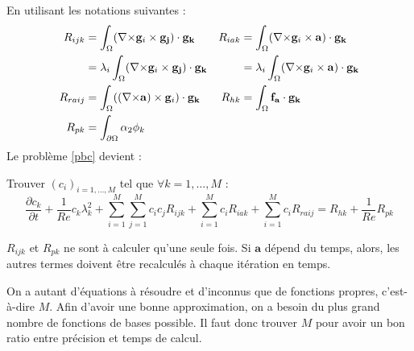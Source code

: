 En utilisant les notations suivantes :
\begin{align*}
  R_{ijk} &= \int_\Omega({\nabla\times}\mathbf{g}_i\times \mathbf{g_j})\cdot\mathbf{g_k} & R_{iak} &= \int_\Omega({\nabla\times}\mathbf{g}_i\times \mathbf{a})\cdot\mathbf{g_k}\\
  &= \lambda_i\int_\Omega({\nabla\times}\mathbf{g}_i\times \mathbf{g_j})\cdot\mathbf{g_k} & &= \lambda_i\int_\Omega({\nabla\times}\mathbf{g}_i\times \mathbf{a})\cdot\mathbf{g_k}\\
R_{raij} &= \int_\Omega(({\nabla\times}\mathbf{a})\times \mathbf{g}_i)\cdot\mathbf{g_k} & R_{hk} &= \int_\Omega\mathbf{f_a}\cdot\mathbf{g_k}\\
R_{pk} &= \int_{\partial\Omega} \alpha_2\phi_k
\end{align*}
Le problème \ref{pbc} devient :
\begin{pb}\label{fvc}
Trouver $(c_i)_{i=1,\dots,M}$ tel que $\forall k=1,\dots,M$ :
\begin{equation*}
\frac{\partial c_k}{\partial t} + \frac{1}{Re}c_k\lambda_k^2 + \sum_{i=1}^M\sum_{j=1}^Mc_ic_jR_{ijk} + \sum_{i=1}^Mc_iR_{iak} + \sum_{i=1}^Mc_iR_{raij} = R_{hk} + \frac{1}{Re}R_{pk}
\end{equation*}\end{pb}

\begin{rk}
$R_{ijk}$ et $R_{pk}$ ne sont à calculer qu'une seule fois. Si $\mathbf{a}$ dépend du temps, alors, les autres termes doivent être recalculés à chaque itération en temps.
\end{rk}
\begin{rk}
On a autant d'équations à résoudre et d'inconnus que de fonctions propres, c'est-à-dire $M$. Afin d'avoir une bonne approximation, on a besoin du plus grand nombre de fonctions de bases possible. Il faut donc trouver $M$ pour avoir un bon ratio entre précision et temps de calcul.
\end{rk}

